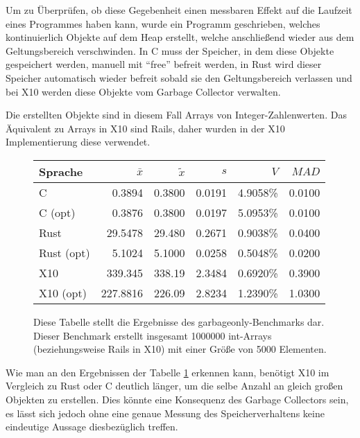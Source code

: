 Um zu Überprüfen, ob diese Gegebenheit einen messbaren Effekt auf die Laufzeit eines Programmes haben kann,
wurde ein Programm geschrieben, welches kontinuierlich Objekte auf dem Heap erstellt,
welche anschließend wieder aus dem Geltungsbereich verschwinden.
In C muss der Speicher, in dem diese Objekte gespeichert werden, manuell mit "`free"' befreit werden,
in Rust wird dieser Speicher automatisch wieder befreit sobald sie den Geltungsbereich verlassen und bei
X10 werden diese Objekte vom Garbage Collector verwalten.

Die erstellten Objekte sind in diesem Fall Arrays von Integer-Zahlenwerten.
Das Äquivalent zu Arrays in X10 sind Rails, daher wurden in der X10 Implementierung diese verwendet.

\begin{figure}[hb]
	\begin{center}
		\begin{tabular}{lrrrrr}
			\toprule
			Sprache    & $\bar{x}$ & $\tilde{x}$ & $s$ & $V$ & $MAD$ \\
			\midrule
			C          & 0.3894   & 0.3800 & 0.0191 & 4.9058\% & 0.0100 \\
			C (opt)    & 0.3876   & 0.3800 & 0.0197 & 5.0953\% & 0.0100 \\
			Rust       & 29.5478  & 29.480 & 0.2671 & 0.9038\% & 0.0400 \\
			Rust (opt) & 5.1024   & 5.1000 & 0.0258 & 0.5048\% & 0.0200 \\
			X10        & 339.345  & 338.19 & 2.3484 & 0.6920\% & 0.3900 \\
			X10 (opt)  & 227.8816 & 226.09 & 2.8234 & 1.2390\% & 1.0300 \\
			\bottomrule
		\end{tabular}
	\end{center}
	\caption{
		Diese Tabelle stellt die Ergebnisse des garbageonly-Benchmarks dar. Dieser Benchmark erstellt insgesamt 1000000
		int-Arrays (beziehungsweise Rails in X10) mit einer Größe von 5000 Elementen.
	}
	\label{fig:garbageonly_table}
\end{figure}

Wie man an den Ergebnissen der Tabelle \ref{fig:garbageonly_table} erkennen kann,
benötigt X10 im Vergleich zu Rust oder C deutlich länger, um die selbe Anzahl an gleich großen Objekten zu erstellen. 
Dies könnte eine Konsequenz des Garbage Collectors sein, es lässt sich jedoch ohne eine genaue Messung des
Speicherverhaltens keine eindeutige Aussage diesbezüglich treffen.

